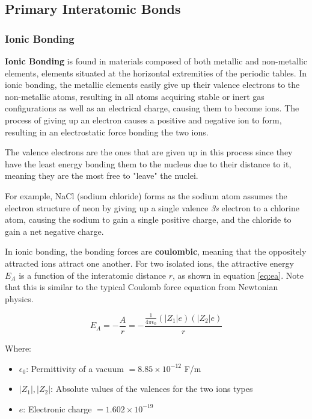 \documentclass{article}
\begin{document}
\subsection{Primary Interatomic Bonds}

\subsubsection{Ionic Bonding}

\textbf{Ionic Bonding} is found in materials composed of both metallic and non-metallic elements, elements situated at the horizontal extremities of the periodic tables. In ionic bonding, the metallic elements easily give up their valence electrons to the non-metallic atoms, resulting in all atoms acquiring stable or inert gas configurations as well as an electrical charge, causing them to become ions. The process of giving up an electron causes a positive and negative ion to form, resulting in an electrostatic force bonding the two ions.

The valence electrons are the ones that are given up in this process since they have the least energy bonding them to the nucleus due to their distance to it, meaning they are the most free to "leave" the nuclei.

For example, NaCl (sodium chloride) forms as the sodium atom assumes the electron structure of neon by giving up a single valence \textit{3s} electron to a chlorine atom, causing the sodium to gain a single positive charge, and the chloride to gain a net negative charge.

In ionic bonding, the bonding forces are \textbf{coulombic}, meaning that the oppositely attracted ions attract one another. For two isolated ions, the attractive energy $E_A$ is a function of the interatomic distance $r$, as shown in equation \ref{eq:ea}. Note that this is similar to the typical Coulomb force equation from Newtonian physics.

\begin{equation}\label{eq:ea} 
    E_A = -\frac{A}{r} = -\frac{\frac{1}{4\pi\epsilon_0}(|Z_1|e)(|Z_2|e)}{r}
\end{equation}

Where:

\begin{itemize}
    \item $\epsilon_0$: Permittivity of a vacuum $= 8.85 \times 10^{-12}$ F/m
    \item $|Z_1|, |Z_2|$: Absolute values of the valences for the two ions types
    \item $e$: Electronic charge $= 1.602 \times 10^{-19}$
\end{itemize}
\end{document}
